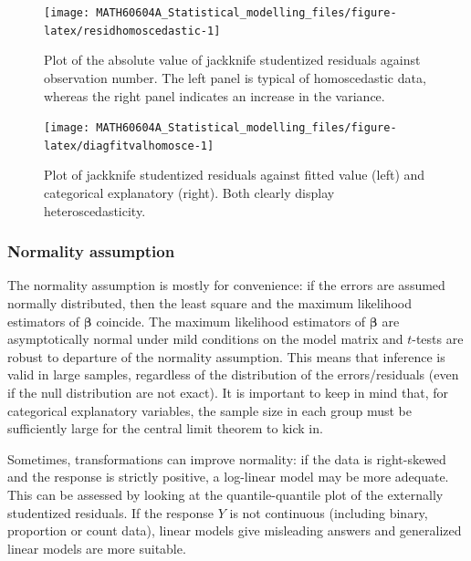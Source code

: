 \documentclass[
  11pt,
  letterpaper,
]{book}
\theoremstyle{definition}
\theoremstyle{definition}
\theoremstyle{definition}
\theoremstyle{definition}
\theoremstyle{remark}
\begin{document}
\begin{figure}

{\centering \texttt{[image: MATH60604A\_Statistical\_modelling\_files/figure-latex/residhomoscedastic-1]} 

}

\caption{Plot of the absolute value of jackknife studentized residuals against observation number. The left panel is typical of homoscedastic data, whereas the right panel indicates an increase in the variance.}\label{fig:residhomoscedastic}
\end{figure}

\begin{figure}

{\centering \texttt{[image: MATH60604A\_Statistical\_modelling\_files/figure-latex/diagfitvalhomosce-1]} 

}

\caption{Plot of jackknife studentized residuals against fitted value (left) and categorical explanatory (right). Both clearly display heteroscedasticity.}\label{fig:diagfitvalhomosce}
\end{figure}

\hypertarget{normality-assumption}{%
\subsubsection{Normality assumption}\label{normality-assumption}}

The normality assumption is mostly for convenience: if the errors are assumed normally distributed, then the least square and the maximum likelihood estimators of \(\boldsymbol{\beta}\) coincide.
The maximum likelihood estimators of \(\boldsymbol{\beta}\) are asymptotically normal under mild conditions on the model matrix and \(t\)-tests are robust to departure of the normality assumption. This means that inference is valid in large samples, regardless of the distribution of the errors/residuals (even if the null distribution are not exact). It is important to keep in mind that, for categorical explanatory variables, the sample size in each group must be sufficiently large for the central limit theorem to kick in.

Sometimes, transformations can improve normality: if the data is right-skewed and the response is strictly positive, a log-linear model may be more adequate. This can be assessed by looking at the quantile-quantile plot of the externally studentized residuals. If the response \(Y\) is not continuous (including binary, proportion or count data), linear models give misleading answers and generalized linear models are more suitable.
\end{document}
